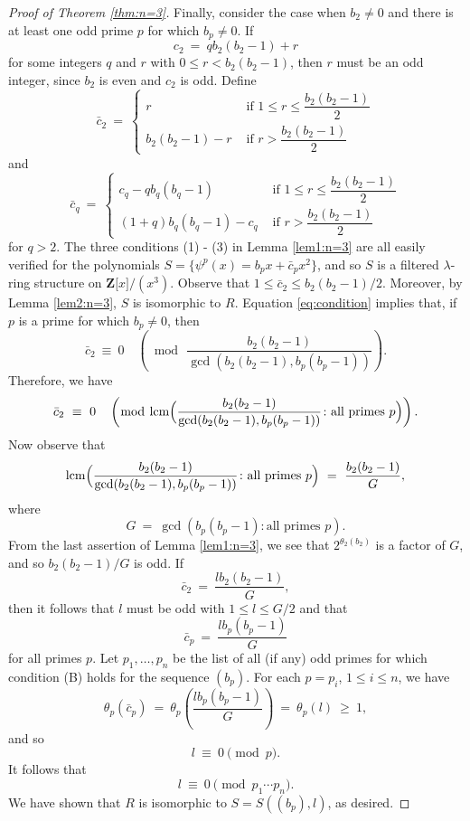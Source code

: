 \documentclass[reqno,11pt]{amsart}
\numberwithin{equation}{subsection}  %
\newcommand{\bZ}{\mathbf{Z}}
\DeclareMathOperator{\lcm}{lcm}
\begin{document}
\begin{proof}[Proof of Theorem \ref{thm:n=3}]
Finally, consider the case when $b_2 \not= 0$ and there is at least one odd prime $p$ for which $b_p \not= 0$.  If
   \[
   c_2 ~=~ qb_2(b_2 - 1) + r
   \]
for some integers $q$ and $r$ with $0 \leq r < b_2(b_2 - 1)$, then $r$ must be an odd integer, since $b_2$ is even and $c_2$ is odd.  Define 
   \[
   \bar{c}_2 ~=~ \begin{cases} r & \text{ if } 1 \leq r \leq \dfrac{b_2(b_2 - 1)}{2} \\ b_2(b_2 - 1) - r & \text{ if } r > \dfrac{b_2(b_2 - 1)}{2} \end{cases}
   \]
and 
   \[
   \bar{c}_q ~=~ \begin{cases} c_q - qb_q(b_q - 1) & \text{ if }  1 \leq r \leq \dfrac{b_2(b_2 - 1)}{2} \\ (1 + q)b_q(b_q - 1) - c_q & \text{ if }  r > \dfrac{b_2(b_2 - 1)}{2} \end{cases}
   \]
for $q > 2$.  The three conditions (1) - (3) in Lemma \ref{lem1:n=3} are all easily verified for the polynomials $S = \lbrace \psi^p(x) = b_p x + \bar{c}_px^2 \rbrace$, and so $S$ is a filtered $\lambda$-ring structure on $\bZ\lbrack x \rbrack/(x^3)$.  Observe that $1 \leq \bar{c}_2 \leq b_2(b_2 - 1)/2$.  Moreover, by Lemma \ref{lem2:n=3}, $S$ is isomorphic to $R$.  Equation \eqref{eq:condition} implies that, if $p$ is a prime for which $b_p \not= 0$, then 
   \[
   \bar{c}_2 ~\equiv~ 0 \quad \left(\bmod \, \frac{b_2(b_2 - 1)}{\gcd(b_2(b_2 - 1), b_p(b_p - 1))} \right).
   \]
Therefore, we have 
   \[
   \bar{c}_2 ~\equiv~ 0 \quad \left(\bmod \, \lcm\Bigl( \frac{b_2(b_2 - 1)}{\gcd(b_2(b_2 - 1), b_p(b_p - 1))} \colon \text{all primes }p \Bigr) \right).
   \]
Now observe that
   \[
   \lcm\Bigl( \frac{b_2(b_2 - 1)}{\gcd(b_2(b_2 - 1), b_p(b_p - 1))} \colon \text{all primes }p \Bigr)
   ~=~ \frac{b_2(b_2 - 1)}{G}, 
   \]
where 
   \[
   G ~=~ \gcd(b_p(b_p - 1) \colon \text{all primes }p).
   \]
From the last assertion of Lemma \ref{lem1:n=3}, we see that $2^{\theta_2(b_2)}$ is a factor of $G$, and so $b_2(b_2 - 1)/G$ is odd.   If 
   \[
   \bar{c}_2 ~=~ \frac{l b_2(b_2 - 1)}{G}, 
   \]
then it follows that $l$ must be odd with $1 \leq l \leq G/2$ and that 
   \[
   \bar{c}_p ~=~ \frac{l b_p(b_p - 1)}{G}
   \]
for all primes $p$.   Let $p_1, \ldots, p_n$ be the list of all (if any) odd primes for which condition (B) holds for the sequence $(b_p)$.  For each $p = p_i$, $1 \leq i \leq n$, we have
   \[
   \theta_{p}(\bar{c}_{p}) 
   ~=~ \theta_{p}\left(\frac{l b_p(b_p - 1)}{G}\right)
   ~=~ \theta_{p}(l) 
   ~\geq~ 1,
   \]
and so 
   \[
   l ~\equiv~ 0 \pmod{p}.
   \]
It follows that 
   \[
   l ~\equiv~ 0 \pmod{p_1\cdots p_n}.
   \]
We have shown that $R$ is isomorphic to $S = S((b_p), l)$, as desired.
\end{proof}
\end{document}

